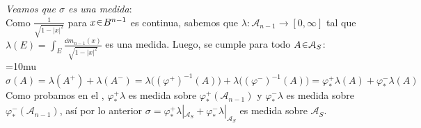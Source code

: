 \begin{sol}
\vspace{1em}
\noindent\emph{Veamos que \(\sigma\) es una medida}:\\
Como $\frac{1}{\sqrt{1-|x|^2}}$ para $x\en B^{n-1}$ es continua, sabemos que $\lambda \colon \mathcal{A}_{n-1} \to [0,\infty]$ tal que $\lambda(E) = \int_E\frac{\dd{m_{n-1}(x)}}{\sqrt{1-|x|^2}}$ es una medida. Luego, se cumple para todo $A\en\mathcal{A}_S$:
{\thickmuskip=10mu
\[
\sigma(A) 
= \lambda(A^+) + \lambda(A^-)
= \lambda\bigl((\varphi^+)^{-1}(A)\bigr) + \lambda\bigl((\varphi^-)^{-1}(A)\bigr)
= \varphi^+_*\lambda(A) + \varphi^-_*\lambda(A)
\]
}%
Como probamos en el , $\varphi^+_*\lambda$ es medida sobre $\varphi^+_*(\mathcal{A}_{n-1})$ y $\varphi^-_*\lambda$ es medida sobre $\varphi^-_*(\mathcal{A}_{n-1})$, así por lo anterior $\sigma = \varphi^+_*\lambda|_{\mathcal{A}_S} + \varphi^-_*\lambda|_{\mathcal{A}_S}$ es medida sobre $\mathcal{A}_S$.


\end{sol}
